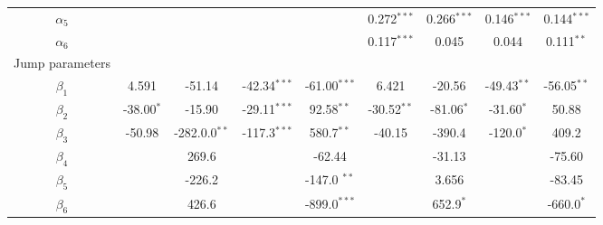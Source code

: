 \documentclass[10pt]{article}
\begin{document}
\begin{landscape}
\begin{center}
\begin{tabular}{c|cccc|cccc}
$\alpha_5$  &                                 &                                  &                                   &                                     &0.272$^{\ast \ast \ast}$  &0.266$^{\ast \ast \ast}$& 0.146$^{\ast \ast \ast}$& 0.144$^{\ast \ast \ast}$\\
$\alpha_6$  &                                 &                                  &                                   &                                    &0.117$^{\ast \ast \ast}$   &0.045                         & 0.044                         & 0.111$^{\ast \ast }$       \\  
Jump parameters&                           &           &           &            &            &            &              &                 \\
$\beta_1$   &4.591                          &-51.14                        &-42.34$^{\ast \ast \ast}$   &-61.00$^{\ast \ast \ast}$  &6.421                            &-20.56                      &-49.43$^{\ast \ast}$      &-56.05$^{\ast \ast}$      \\
$\beta_2$   &-38.00$^{\ast}$             &-15.90                        &-29.11$^{\ast \ast \ast}$   &92.58$^{\ast \ast}$         &-30.52$^{\ast \ast}$       &-81.06$^{\ast}$            &-31.60$^{\ast}$             &50.88                          \\
$\beta_3$   &-50.98                       &-282.0.0$^{\ast\ast}$     &-117.3$^{\ast \ast \ast}$   &580.7$^{\ast \ast}$         &-40.15                        &-390.4                          &-120.0$^{\ast}$             &409.2                          \\  
$\beta_4$   &                                 &269.6                         &                                     &-62.44                            &                                    &-31.13                      &                                  &-75.60                       \\
$\beta_5$   &                                &-226.2                         &                                      &-147.0 $^{\ast \ast}$      &                                   &3.656                          &                                   &-83.45                      \\
$\beta_6$   &                                 &426.6                          &                                   &-899.0$^{\ast \ast \ast}$  &                                   &652.9$^{\ast}$               &                                &-660.0$^{\ast}$            \\  

\end{tabular}
\end{center}
\end{landscape}
\end{document}
